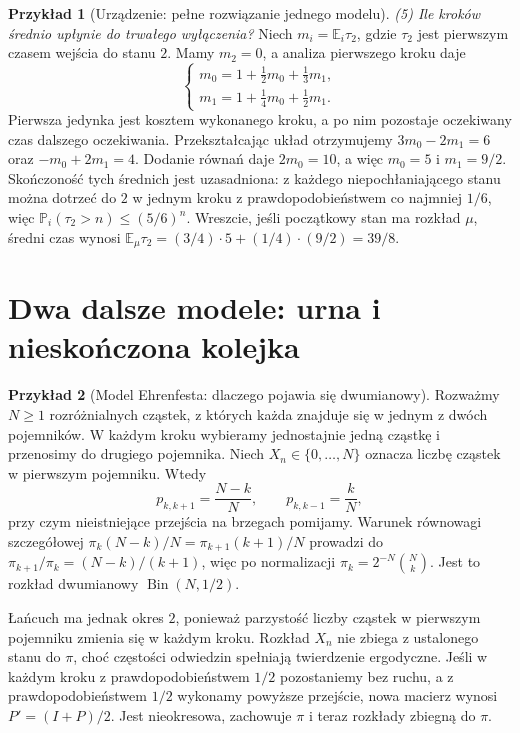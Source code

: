 \documentclass[11pt,a4paper,oneside]{report}
\numberwithin{equation}{chapter}
\theoremstyle{plain}
\theoremstyle{definition}
\newtheorem{przyklad}{Przykład}[chapter]
\theoremstyle{remark}
\newcommand{\Prob}{\mathbb{P}}
\newcommand{\E}{\mathbb{E}}
\newcommand{\Bin}{\operatorname{Bin}}
\begin{document}
\begin{przyklad}[Urządzenie: pełne rozwiązanie jednego modelu]
\emph{(5) Ile kroków średnio upłynie do trwałego wyłączenia?}
Niech $m_i=\E_i\tau_2$, gdzie $\tau_2$
jest pierwszym czasem wejścia do stanu $2$.
Mamy $m_2=0$, a analiza pierwszego kroku daje
\[
\begin{cases}
m_0=1+\frac12m_0+\frac13m_1,\\[2pt]
m_1=1+\frac14m_0+\frac12m_1.
\end{cases}
\]
Pierwsza jedynka jest kosztem wykonanego kroku,
a po nim pozostaje oczekiwany czas dalszego
oczekiwania. Przekształcając układ otrzymujemy
$3m_0-2m_1=6$ oraz $-m_0+2m_1=4$.
Dodanie równań daje $2m_0=10$, a więc
$m_0=5$ i $m_1=9/2$.
Skończoność tych średnich jest uzasadniona:
z każdego niepochłaniającego stanu można dotrzeć
do $2$ w jednym kroku z prawdopodobieństwem
co najmniej $1/6$, więc
$\Prob_i(\tau_2>n)\leq(5/6)^n$.
Wreszcie, jeśli początkowy stan ma rozkład $\mu$,
średni czas wynosi
$\E_\mu\tau_2=(3/4)\cdot5+(1/4)\cdot(9/2)=39/8$.
\end{przyklad}

\section{Dwa dalsze modele: urna i nieskończona kolejka}

\begin{przyklad}[Model Ehrenfesta: dlaczego pojawia się dwumianowy]
Rozważmy $N\geq1$ rozróżnialnych cząstek,
z których każda znajduje się w jednym z dwóch
pojemników. W każdym kroku wybieramy jednostajnie
jedną cząstkę i przenosimy do drugiego pojemnika.
Niech $X_n\in\{0,\ldots,N\}$ oznacza liczbę
cząstek w pierwszym pojemniku. Wtedy
\[
p_{k,k+1}=\frac{N-k}{N},\qquad
p_{k,k-1}=\frac{k}{N},
\]
przy czym nieistniejące przejścia na brzegach
pomijamy. Warunek równowagi szczegółowej
$\pi_k(N-k)/N=\pi_{k+1}(k+1)/N$
prowadzi do $\pi_{k+1}/\pi_k=(N-k)/(k+1)$,
więc po normalizacji
$\pi_k=2^{-N}\binom Nk$.
Jest to rozkład dwumianowy $\Bin(N,1/2)$.

Łańcuch ma jednak okres $2$, ponieważ parzystość
liczby cząstek w pierwszym pojemniku zmienia się
w każdym kroku. Rozkład $X_n$ nie zbiega z
ustalonego stanu do $\pi$, choć częstości odwiedzin
spełniają twierdzenie ergodyczne. Jeśli w każdym
kroku z prawdopodobieństwem $1/2$ pozostaniemy
bez ruchu, a z prawdopodobieństwem $1/2$ wykonamy
powyższe przejście, nowa macierz wynosi
$P'=(I+P)/2$. Jest nieokresowa, zachowuje $\pi$
i teraz rozkłady zbiegną do $\pi$.
\end{przyklad}
\end{document}
